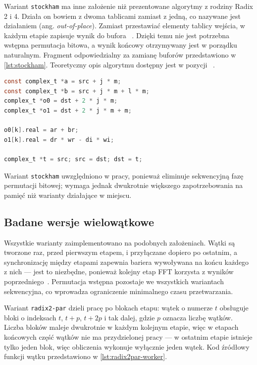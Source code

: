 Wariant \texttt{stockham} ma inne założenie niż prezentowane algorytmy z rodziny Radix 2 i 4. Działa on bowiem z dwoma tablicami
zamiast z jedną, co nazywane jest działaniem  (ang. \textit{out-of-place}).
Zamiast przestawiać elementy tablicy wejścia, w każdym etapie zapisuje wynik do
bufora ~\cite{takahashi2019fast}. Dzięki temu nie jest potrzebna wstępna
permutacja bitowa, a wynik końcowy otrzymywany jest w porządku naturalnym.
Fragment odpowiedzialny za zamianę buforów przedstawiono w \cref{lst:stockham}.
Teoretyczny opis algorytmu dostępny jest w pozycji ~\cite{takahashi2019fast}.
\begin{lstlisting}[language=C,caption={Zapis do drugiego bufora  w wariancie \texttt{stockham}},label=lst:stockham]
const complex_t *a = src + j * m;
const complex_t *b = src + j * m + l * m;
complex_t *o0 = dst + 2 * j * m;
complex_t *o1 = dst + 2 * j * m + m;

o0[k].real = ar + br;
o1[k].real = dr * wr - di * wi;

complex_t *t = src; src = dst; dst = t;  
\end{lstlisting}

Wariant \texttt{stockham} uwzględniono w pracy, ponieważ eliminuje
sekwencyjną fazę permutacji bitowej; wymaga jednak dwukrotnie większego
zapotrzebowania na pamięć niż warianty działające w miejscu.
\subsection{Badane wersje wielowątkowe}

Wszystkie warianty zaimplementowano na podobnych założeniach. Wątki są
tworzone raz, przed pierwszym etapem, i przyłączane dopiero po ostatnim,
a synchronizację między etapami zapewnia bariera wywoływana na końcu każdego
z nich — jest to niezbędne, ponieważ kolejny etap FFT korzysta z wyników
poprzedniego~\cite{POSIX_Threads}. Permutacja wstępna pozostaje we wszystkich
wariantach sekwencyjna, co wprowadza ograniczenie minimalnego czasu przetwarzania.

Wariant \texttt{radix2-par} dzieli pracę po blokach etapu: wątek o numerze $t$
obsługuje bloki o indeksach $t$, $t + p$, $t + 2p$ i tak dalej, gdzie $p$
oznacza liczbę wątków. Liczba bloków maleje dwukrotnie w każdym kolejnym
etapie, więc w etapach końcowych część wątków nie ma przydzielonej pracy —
w ostatnim etapie istnieje tylko jeden blok, więc obliczenia wykonuje
wyłącznie jeden wątek. Kod źródłowy funkcji wątku
przedstawiono w \cref{lst:radix2par-worker}.

